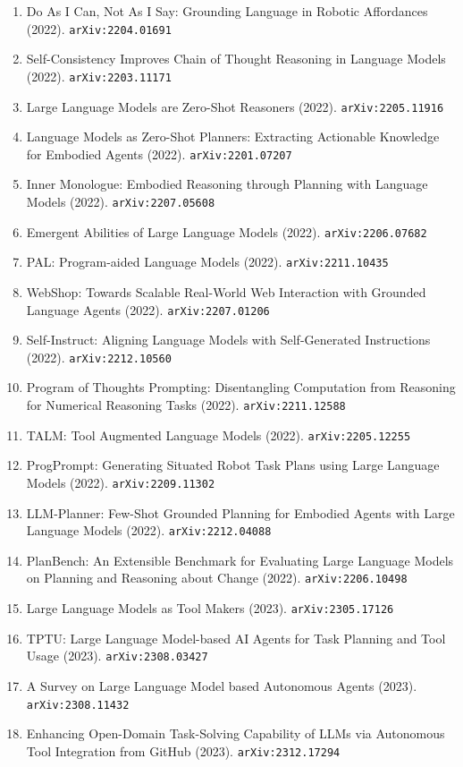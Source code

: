 \documentclass[11pt]{article}
\begin{document}
\begin{enumerate}
  \item Do As I Can, Not As I Say: Grounding Language in Robotic Affordances (2022). \texttt{arXiv:2204.01691}
  \item Self-Consistency Improves Chain of Thought Reasoning in Language Models (2022). \texttt{arXiv:2203.11171}
  \item Large Language Models are Zero-Shot Reasoners (2022). \texttt{arXiv:2205.11916}
  \item Language Models as Zero-Shot Planners: Extracting Actionable Knowledge
  for Embodied Agents (2022). \texttt{arXiv:2201.07207}
  \item Inner Monologue: Embodied Reasoning through Planning with Language
  Models (2022). \texttt{arXiv:2207.05608}
  \item Emergent Abilities of Large Language Models (2022). \texttt{arXiv:2206.07682}
  \item PAL: Program-aided Language Models (2022). \texttt{arXiv:2211.10435}
  \item WebShop: Towards Scalable Real-World Web Interaction with Grounded
  Language Agents (2022). \texttt{arXiv:2207.01206}
  \item Self-Instruct: Aligning Language Models with Self-Generated Instructions (2022). \texttt{arXiv:2212.10560}
  \item Program of Thoughts Prompting: Disentangling Computation from Reasoning
  for Numerical Reasoning Tasks (2022). \texttt{arXiv:2211.12588}
  \item TALM: Tool Augmented Language Models (2022). \texttt{arXiv:2205.12255}
  \item ProgPrompt: Generating Situated Robot Task Plans using Large Language
  Models (2022). \texttt{arXiv:2209.11302}
  \item LLM-Planner: Few-Shot Grounded Planning for Embodied Agents with Large
  Language Models (2022). \texttt{arXiv:2212.04088}
  \item PlanBench: An Extensible Benchmark for Evaluating Large Language Models
  on Planning and Reasoning about Change (2022). \texttt{arXiv:2206.10498}
  \item Large Language Models as Tool Makers (2023). \texttt{arXiv:2305.17126}
  \item TPTU: Large Language Model-based AI Agents for Task Planning and Tool Usage (2023). \texttt{arXiv:2308.03427}
  \item A Survey on Large Language Model based Autonomous Agents (2023). \texttt{arXiv:2308.11432}
  \item Enhancing Open-Domain Task-Solving Capability of LLMs via Autonomous Tool Integration from GitHub (2023). \texttt{arXiv:2312.17294}

\end{enumerate}
\end{document}
